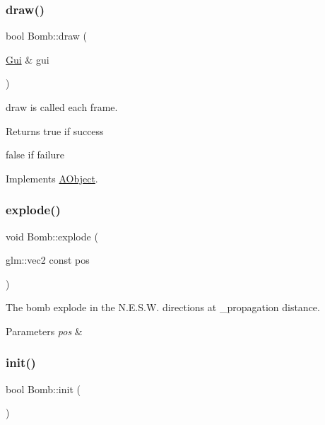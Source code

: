 \subsubsection{\texorpdfstring{draw()}{draw()}}
{\footnotesize\ttfamily bool Bomb\+::draw (\begin{DoxyParamCaption}\item[{\hyperlink{class_gui}{Gui} \&}]{gui }\end{DoxyParamCaption})\hspace{0.3cm}{\ttfamily [virtual]}}



draw is called each frame. 

\begin{DoxyReturn}{Returns}
true if success 

false if failure 
\end{DoxyReturn}


Implements \hyperlink{class_a_object_a5e454e13e04ee937c20a465244cf748a}{A\+Object}.

\mbox{\label{class_bomb_a4d3105c3390626d385bdb5dfd0fa68ff}} 
\subsubsection{\texorpdfstring{explode()}{explode()}}
{\footnotesize\ttfamily void Bomb\+::explode (\begin{DoxyParamCaption}\item[{glm\+::vec2 const}]{pos }\end{DoxyParamCaption})}



The bomb explode in the N.\+E.\+S.\+W. directions at \+\_\+propagation distance. 


\begin{DoxyParams}{Parameters}
{\em pos} & \\
\hline
\end{DoxyParams}
\mbox{\label{class_bomb_a4a3f751937f59953f4cf585b07c9684c}} 
\subsubsection{\texorpdfstring{init()}{init()}}
{\footnotesize\ttfamily bool Bomb\+::init (\begin{DoxyParamCaption}{ }\end{DoxyParamCaption})\hspace{0.3cm}{\ttfamily [virtual]}}



